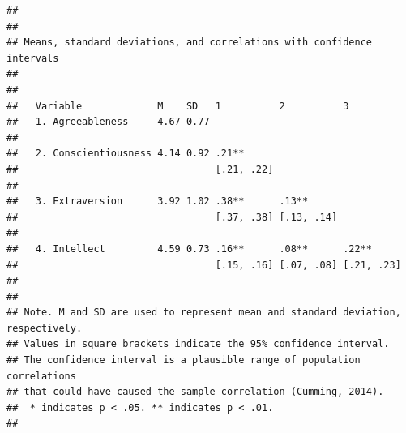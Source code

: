 \documentclass[
  english,
  man]{apa6}
\begin{document}
\begin{verbatim}
## 
## 
## Means, standard deviations, and correlations with confidence intervals
##  
## 
##   Variable             M    SD   1          2          3         
##   1. Agreeableness     4.67 0.77                                 
##                                                                  
##   2. Conscientiousness 4.14 0.92 .21**                           
##                                  [.21, .22]                      
##                                                                  
##   3. Extraversion      3.92 1.02 .38**      .13**                
##                                  [.37, .38] [.13, .14]           
##                                                                  
##   4. Intellect         4.59 0.73 .16**      .08**      .22**     
##                                  [.15, .16] [.07, .08] [.21, .23]
##                                                                  
## 
## Note. M and SD are used to represent mean and standard deviation, respectively.
## Values in square brackets indicate the 95% confidence interval.
## The confidence interval is a plausible range of population correlations 
## that could have caused the sample correlation (Cumming, 2014).
##  * indicates p < .05. ** indicates p < .01.
## 
\end{verbatim}

\begingroup\fontsize{12}{14}\selectfont
\end{document}
